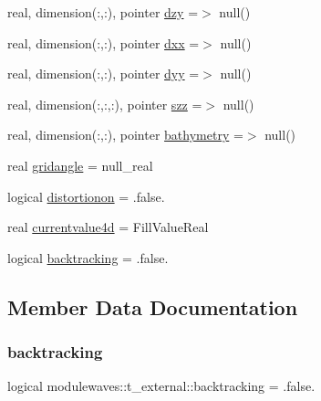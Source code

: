 \begin{DoxyCompactItemize}
\item 
real, dimension(\+:,\+:), pointer \mbox{\hyperlink{structmodulewaves_1_1t__external_a7fe0d3d4ed5543f45baa26f63d53a1e2}{dzy}} =$>$ null()
\item 
real, dimension(\+:,\+:), pointer \mbox{\hyperlink{structmodulewaves_1_1t__external_ad72e1f6a9f787ab0cc11ce5bc4e3cd6d}{dxx}} =$>$ null()
\item 
real, dimension(\+:,\+:), pointer \mbox{\hyperlink{structmodulewaves_1_1t__external_a63615a5a847308a0a08ec5a987626a51}{dyy}} =$>$ null()
\item 
real, dimension(\+:,\+:,\+:), pointer \mbox{\hyperlink{structmodulewaves_1_1t__external_a8f93dab4c95ed2f9b115ede074988245}{szz}} =$>$ null()
\item 
real, dimension(\+:,\+:), pointer \mbox{\hyperlink{structmodulewaves_1_1t__external_a150f964b34af03d47e6a14886746d2c5}{bathymetry}} =$>$ null()
\item 
real \mbox{\hyperlink{structmodulewaves_1_1t__external_a473c49fe8d710dbe3a37afb27d2f442b}{gridangle}} = null\+\_\+real
\item 
logical \mbox{\hyperlink{structmodulewaves_1_1t__external_ae4529316591b6869317579da9b540065}{distortionon}} = .false.
\item 
real \mbox{\hyperlink{structmodulewaves_1_1t__external_ae72056331b1831966674a61439b44831}{currentvalue4d}} = Fill\+Value\+Real
\item 
logical \mbox{\hyperlink{structmodulewaves_1_1t__external_ae6e52049e93b8d0474da1df236f6d01b}{backtracking}} = .false.
\end{DoxyCompactItemize}


\subsection{Member Data Documentation}
\mbox{\label{structmodulewaves_1_1t__external_ae6e52049e93b8d0474da1df236f6d01b}} 
\subsubsection{\texorpdfstring{backtracking}{backtracking}}
{\footnotesize\ttfamily logical modulewaves\+::t\+\_\+external\+::backtracking = .false.\hspace{0.3cm}{\ttfamily [private]}}

